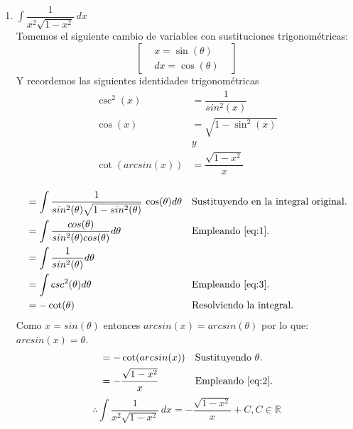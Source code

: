 \documentclass[letterpaper]{article}
\newcommand{\R}{\mathds{R}}
\renewcommand{\*}{\cdot}
\theoremstyle{definition}
\begin{document}
\begin{enumerate}
\begin{enumerate}
\item$\displaystyle \int  \dfrac{1}{x^2 \sqrt{1 - x^2}} \, dx$\\
Tomemos el siguiente cambio de variables con sustituciones trigonométricas:
\[  \begin{bmatrix}
& x = \sin(\theta) &\\
&dx = \cos(\theta) &
\end{bmatrix} \]
Y recordemos las siguientes identidades trigonométricas
\begin{align*}
\csc^2(x) &= \dfrac{1}{sin^2(x)} \tag{$\alpha$}\label{eq:3} \\
\cos(x) &= \sqrt{1 - \sin^2(x)} \tag{$\theta$}\label{eq:1} \\ 
&y\\
\cot(arcsin(x)) &= \dfrac{\sqrt{1-x^2}}{x} \tag{$\beta$}\label{eq:2} \\
\end{align*}

\begin{align*}
&=\int  \dfrac{1}{sin^2({\theta}) \sqrt{1 - sin^2({\theta})}} \, \cos({\theta}) d\theta&&\text{Sustituyendo en la integral original.}\\
&=\int \dfrac{cos({\theta})}{sin^2({\theta})cos({\theta})}d\theta &&\text{Empleando \ref{eq:1}.}\\
&=\int \dfrac{1}{sin^2({\theta})} d\theta\\
&=\int csc^2({\theta}) d\theta  &&\text{Empleando \ref{eq:3}.}\\
&=-\cot({\theta}) &&\text{Resolviendo la integral.}\\
\end{align*}
Como $ x = sin({\theta}) $ entonces $ arcsin(x) = arcsin({\theta})$ por lo que: $arcsin(x) = \theta$. \\
\begin{align*}
&= -\cot(arcsin(x)) &&\text{Sustituyendo $\theta$.}\\
&= - \dfrac{\sqrt{1-x^2}}{x} &&\text{Empleando \ref{eq:2}.}
\end{align*}
\[ \therefore \int  \dfrac{1}{x^2 \sqrt{1 - x^2}} \, dx = -\dfrac{{\sqrt{1 - x^2}}}{x} + C, C \in \R \]



\end{enumerate}
\end{enumerate}
\end{document}

